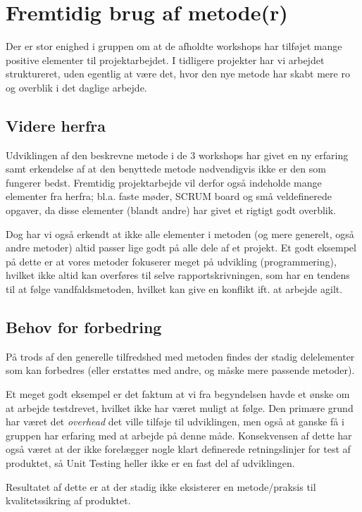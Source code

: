 \section{Fremtidig brug af metode(r)}\label{workshop3:fremtidig_brug}
Der er stor enighed i gruppen om at de afholdte workshops har tilføjet mange positive elementer til projektarbejdet.
I tidligere projekter har vi arbejdet struktureret, uden egentlig at være det, hvor den nye metode har skabt mere ro og overblik i det daglige arbejde.

\subsection{Videre herfra}
Udviklingen af den beskrevne metode i de 3 workshops har givet en ny erfaring samt erkendelse af at den benyttede metode nødvendigvis ikke er den som fungerer bedst.
Fremtidig projektarbejde vil derfor også indeholde mange elementer fra herfra; bl.a. faste møder, SCRUM board og små veldefinerede opgaver, da disse elementer (blandt andre) har givet et rigtigt godt overblik.

Dog har vi også erkendt at ikke alle elementer i metoden (og mere generelt, også andre metoder) altid passer lige godt på alle dele af et projekt.
Et godt eksempel på dette er at vores metoder fokuserer meget på udvikling (programmering), hvilket ikke altid kan overføres til selve rapportskrivningen, som har en tendens til at følge vandfaldsmetoden, hvilket kan give en konflikt ift. at arbejde agilt.

\subsection{Behov for forbedring}
På trods af den generelle tilfredshed med metoden findes der stadig delelementer som kan forbedres (eller erstattes med andre, og måske mere passende metoder).

Et meget godt eksempel er det faktum at vi fra begyndelsen havde et ønske om at arbejde testdrevet, hvilket ikke har været muligt at følge.
Den primære grund har været det \textit{overhead} det ville tilføje til udviklingen, men også at ganske få i gruppen har erfaring med at arbejde på denne måde.
Konsekvensen af dette har også været at der ikke forelægger nogle klart definerede retningslinjer for test af produktet, så Unit Testing heller ikke er en fast del af udviklingen.

Resultatet af dette er at der stadig ikke eksisterer en metode/praksis til kvalitetssikring af produktet.
